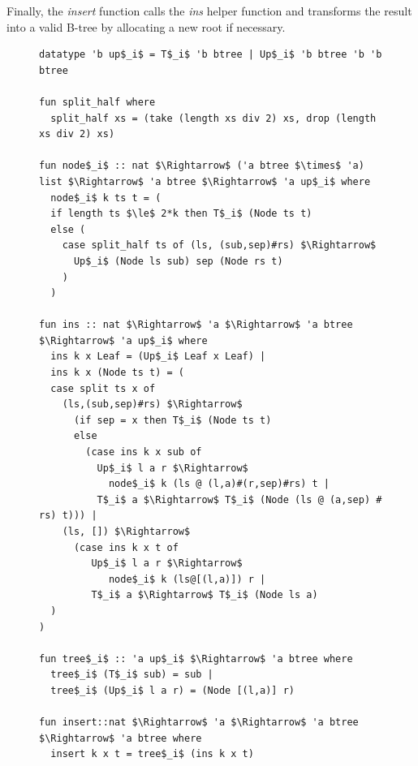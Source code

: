 Finally, the \textit{insert} function calls the \textit{ins} helper function
and transforms the result into a valid B-tree by allocating a new root if necessary.

\begin{figure}
    
\begin{lstlisting}[mathescape=true, language=Isabelle, label=lst:ins-fun, caption={
    The \textit{insert} function
}]
datatype 'b up$_i$ = T$_i$ 'b btree | Up$_i$ 'b btree 'b 'b btree

fun split_half where
  split_half xs = (take (length xs div 2) xs, drop (length xs div 2) xs)

fun node$_i$ :: nat $\Rightarrow$ ('a btree $\times$ 'a) list $\Rightarrow$ 'a btree $\Rightarrow$ 'a up$_i$ where
  node$_i$ k ts t = (
  if length ts $\le$ 2*k then T$_i$ (Node ts t)
  else (
    case split_half ts of (ls, (sub,sep)#rs) $\Rightarrow$
      Up$_i$ (Node ls sub) sep (Node rs t)
    )
  )

fun ins :: nat $\Rightarrow$ 'a $\Rightarrow$ 'a btree $\Rightarrow$ 'a up$_i$ where
  ins k x Leaf = (Up$_i$ Leaf x Leaf) |
  ins k x (Node ts t) = (
  case split ts x of
    (ls,(sub,sep)#rs) $\Rightarrow$ 
      (if sep = x then T$_i$ (Node ts t)
      else
        (case ins k x sub of 
          Up$_i$ l a r $\Rightarrow$
            node$_i$ k (ls @ (l,a)#(r,sep)#rs) t | 
          T$_i$ a $\Rightarrow$ T$_i$ (Node (ls @ (a,sep) # rs) t))) |
    (ls, []) $\Rightarrow$
      (case ins k x t of
         Up$_i$ l a r $\Rightarrow$
            node$_i$ k (ls@[(l,a)]) r |
         T$_i$ a $\Rightarrow$ T$_i$ (Node ls a)
  )
)

fun tree$_i$ :: 'a up$_i$ $\Rightarrow$ 'a btree where
  tree$_i$ (T$_i$ sub) = sub |
  tree$_i$ (Up$_i$ l a r) = (Node [(l,a)] r)

fun insert::nat $\Rightarrow$ 'a $\Rightarrow$ 'a btree $\Rightarrow$ 'a btree where
  insert k x t = tree$_i$ (ins k x t)
\end{lstlisting}

\end{figure}

